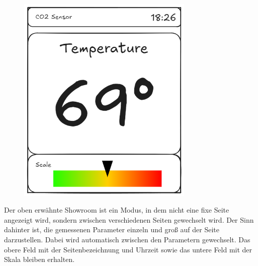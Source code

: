 \begin{inhalt}
\begin{figure}[!htb]
\centering
\includegraphics[width=0.75\textwidth]{files/Tobias/pics/Skizzen/Showroom1.png}
\caption[Display Interface Skizze (Showroom)]{}
\label{fig:display_skizze_showroom1}
\end{figure}

Der oben erwähnte Showroom ist ein Modus, in dem nicht eine fixe Seite angezeigt wird, sondern zwischen verschiedenen Seiten gewechselt wird. Der Sinn dahinter ist, die gemessenen Parameter einzeln und groß auf der Seite darzustellen. Dabei wird automatisch zwischen den Parametern gewechselt. Das obere Feld mit der Seitenbezeichnung und Uhrzeit sowie das untere Feld mit der Skala bleiben erhalten.

\end{inhalt}